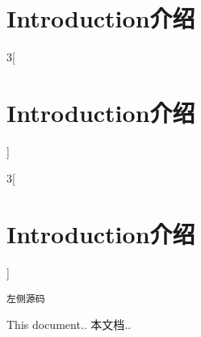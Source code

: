
\section{Introduction\hfill 介绍}


\begin{paracol}{3}[\section{Introduction\hfill 介绍}]
\begin{paracol}{3}[\section{Introduction\hfill 介绍}]
\begin{Verbatim}
左侧源码
\end{Verbatim}
\switchcolumn
This document..
\switchcolumn
本文档..
\end{paracol}    
\switchcolumn
\switchcolumn


\end{paracol}



